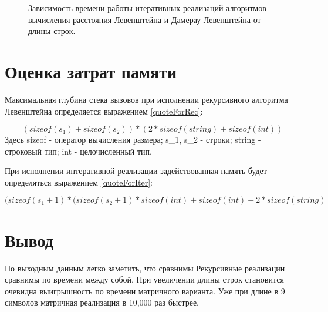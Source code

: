 \documentclass[12pt]{report}
\begin{document}
\begin{figure}[h]
	\begin{center}
	\captionsetup{justification=centering}
	\caption{Зависимость времени работы итеративных реализаций алгоритмов вычисления расстояния Левенштейна и Дамерау-Левенштейна от длины строк.}
	\label{IterTime}
	\end{center}
\end{figure}

\section{Оценка затрат памяти}
Максимальная глубина стека вызовов при исполнении рекурсивного алгоритма Левенштейна определяется выражением \ref{quoteForRec}:

\begin{equation}
\label{quoteForRec}
(sizeof(s_{1}) + sizeof(s_{2})) * (2 * sizeof(string) + sizeof(int))
\end{equation}
Здесь sizeof - оператор вычисления размера; s_{1}, s_{2} - строки; string - строковый тип; int - целочисленный тип.

При исполнении интеративной реализации задействованная память будет определяться выражением \ref{quoteForIter}:

\begin{equation}
\label{quoteForIter}
(sizeof(s_{1} + 1) * (sizeof(s_{2} + 1) * sizeof(int) + sizeof(int) + 2 * sizeof(string)
\end{equation}

\section{Вывод}
По выходным данным легко заметить, что сравнимы Рекурсивные реализации сравнимы по времени между собой. При увеличении длины строк становится очевидна выигрышность по времени матричного варианта. Уже при длине в 9 символов матричная реализация в 10,000 раз быстрее.
\end{document}
